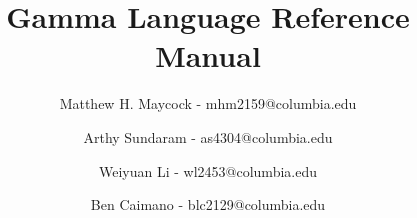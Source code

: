 
\title{Gamma Language Reference Manual}
\author{
	Matthew H. Maycock - mhm2159@columbia.edu
	\and Arthy Sundaram - as4304@columbia.edu
	\and Weiyuan Li - wl2453@columbia.edu
	\and Ben Caimano - blc2129@columbia.edu
}


\newcommand{\Lang}{GAMMA}
\newcommand{\Compiler}{ray}



\maketitle

\pagebreak

\tableofcontents

\pagebreak









